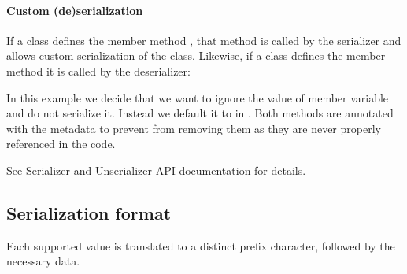 \paragraph{Custom (de)serialization}

If a class defines the member method , that method is called by the serializer and allows custom serialization of the class. Likewise, if a class defines the member method  it is called by the deserializer:


In this example we decide that we want to ignore the value of member variable  and do not serialize it. Instead we default it to  in . Both methods are annotated with the  metadata to prevent  from removing them as they are never properly referenced in the code.

See \href{https://api.haxe.org/haxe/Serializer.html}{Serializer} and \href{https://api.haxe.org/haxe/Unserializer.html}{Unserializer} API documentation for details.

\subsection{Serialization format}
\label{std-serialization-format}

Each supported value is translated to a distinct prefix character, followed by the necessary data.


